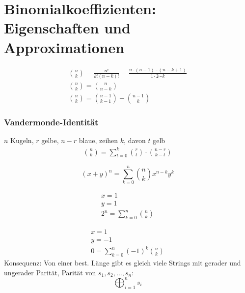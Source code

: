 \section{Binomialkoeffizienten: Eigenschaften und Approximationen}
\begin{gather*}
	\binom{n}{k} = \frac{n!}{k!(n-k)!} = \frac{n\cdot (n-1) \dotsm (n-k+1)}{1 \cdot 2 \dotsm k}\\
	\binom{n}{k} = \binom{n}{n-k} \\
	\binom{n}{k} = \binom{n-1}{k-1} + \binom{n-1}{k}
\end{gather*}

\subsubsection{Vandermonde-Identität}
$n$ Kugeln, $r$ gelbe, $n-r$ blaue, zeihen $k$, davon $t$ gelb\\
\begin{gather*}
	\binom{n}{k} = \sum_{t=0}^k \binom{r}{t} \cdot \binom{n-r}{k-t}
\end{gather*}
\begin{satz*}[note = Binomialsatz , index = Binomialsatz]
	\[ (x+y)^n = \sum_{k=0}^n \binom{n}{k} x^{n-k} y^k \]
\end{satz*}
\begin{bsp*}
	\begin{gather*}
		x=1 \\
		y=1 \\
		2^n = \sum_{k=0}^n \binom{n}{k}
	\end{gather*}
\end{bsp*}
\begin{bsp*}
	\begin{gather*}
		x=1 \\
		y=-1 \\
		0 = \sum_{k=0}^n (-1)^k \binom{n}{k}
	\end{gather*}
	Konsequenz: Von einer best. Länge gibt es gleich viele Strings mit gerader und ungerader Parität, Parität von $s_1,s_2,\dotsc,s_n:$\\
	\[ \bigoplus_{i=1}^n s_i \]
\end{bsp*}

